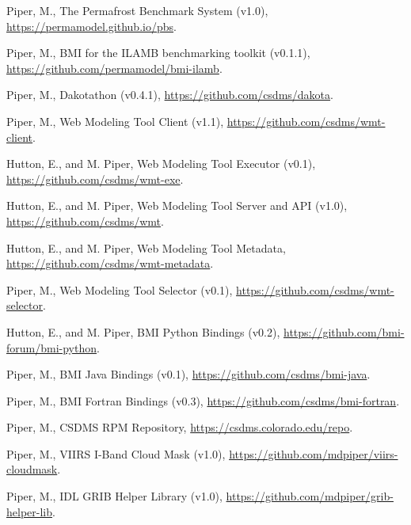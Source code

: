 \documentclass[letterpaper]{resume}
\begin{document}
\begin{enumerate}[{[}1{]}]

  \item Piper, M., The Permafrost Benchmark System (v1.0),
    \url{https://permamodel.github.io/pbs}.

  \item Piper, M., BMI for the ILAMB benchmarking toolkit (v0.1.1),
    \url{https://github.com/permamodel/bmi-ilamb}.

  \item Piper, M., Dakotathon (v0.4.1),
    \url{https://github.com/csdms/dakota}.

  \item Piper, M., Web Modeling Tool Client (v1.1),
    \url{https://github.com/csdms/wmt-client}.

  \item Hutton, E., and M. Piper, Web Modeling Tool Executor (v0.1),
    \url{https://github.com/csdms/wmt-exe}.

  \item Hutton, E., and M. Piper, Web Modeling Tool Server and API (v1.0),
    \url{https://github.com/csdms/wmt}.

  \item Hutton, E., and M. Piper, Web Modeling Tool Metadata,
    \url{https://github.com/csdms/wmt-metadata}.

  \item Piper, M., Web Modeling Tool Selector (v0.1),
    \url{https://github.com/csdms/wmt-selector}.

  \item Hutton, E., and M. Piper, BMI Python Bindings (v0.2),
    \url{https://github.com/bmi-forum/bmi-python}.

  \item Piper, M., BMI Java Bindings (v0.1),
    \url{https://github.com/csdms/bmi-java}.

  \item Piper, M., BMI Fortran Bindings (v0.3),
    \url{https://github.com/csdms/bmi-fortran}.

  \item Piper, M., CSDMS RPM Repository,
    \url{https://csdms.colorado.edu/repo}.

  \item Piper, M., VIIRS I-Band Cloud Mask (v1.0),
    \url{https://github.com/mdpiper/viirs-cloudmask}.

  \item Piper, M., IDL GRIB Helper Library (v1.0),
    \url{https://github.com/mdpiper/grib-helper-lib}.

\end{enumerate}
\end{document}

